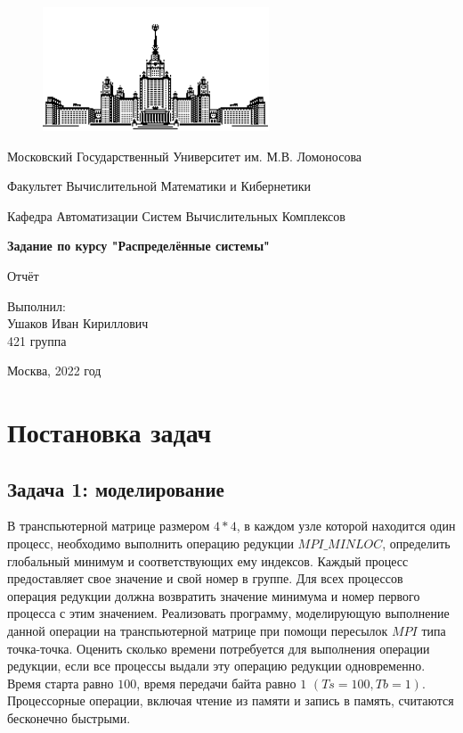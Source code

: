 \documentclass[a4paper]{article}
\begin{document}
\begin{titlepage}
\thispagestyle{empty}

\begin{center}
\begin{figure}[htbp]
  \centering
  \includegraphics[width=0.6\textwidth]{msu}
\end{figure}


Московский Государственный Университет им. М.В. Ломоносова

Факультет Вычислительной Математики и Кибернетики

Кафедра Автоматизации Систем Вычислительных Комплексов

\vfill
\textbf{\huge Задание по курсу "Распределённые системы"}

{\huge Отчёт}
\end{center}

\vfill
\begin{flushright}
{\large Выполнил:\\Ушаков Иван Кириллович\\421 группа\\}
\end{flushright}

\centerline{Москва, 2022 год}

\end{titlepage}
\linespread{1.7}
\setcounter{page}{2}
\large

\tableofcontents
\newpage

\section{Постановка задач}

\subsection{Задача 1: моделирование}
В транспьютерной матрице размером $4*4$, в каждом узле которой находится один процесс, необходимо выполнить операцию редукции $MPI\_MINLOC$, определить глобальный минимум и соответствующих ему индексов.
Каждый процесс предоставляет свое значение и свой номер в группе. Для всех процессов операция редукции должна возвратить значение минимума и номер первого процесса с этим значением.
Реализовать программу, моделирующую выполнение данной операции на транспьютерной матрице при помощи пересылок $MPI$ типа точка-точка.
Оценить сколько времени потребуется для выполнения операции редукции, если все процессы выдали эту операцию редукции одновременно. Время старта равно $100$, время передачи байта равно $1$ $(Ts=100,Tb=1)$. Процессорные операции, включая чтение из памяти и запись в память, считаются бесконечно быстрыми.
\end{document}
